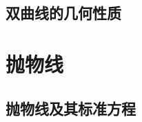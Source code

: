 \subsection{双曲线的几何性质}
\begin{Practice}
  \begin{question}
    \item 
    \item 
    \item 
  \end{question}
\end{Practice}
\begin{Exercise}
  \begin{question}
    \item
    \item
    \item
    \item
    \item
    \item
    \item
    \item
    \item
    \item
    \item
    \item
    \item
    \item
    \item
    \item
    \item
    \item
  \end{question}
\end{Exercise}
\section{抛物线}
\subsection{抛物线及其标准方程}
\begin{Practice}
  \begin{question}
    \item 
    \item 
    \item 
  \end{question}
\end{Practice}
